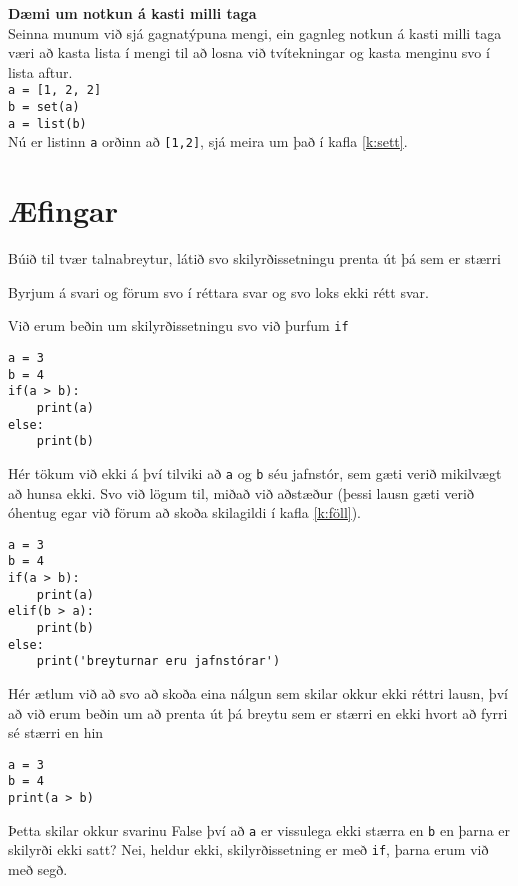 \begin{itarefni}
\textbf{Dæmi um notkun á kasti milli taga}\\
Seinna munum við sjá gagnatýpuna mengi, ein gagnleg notkun á kasti milli taga væri að kasta lista í mengi til að losna við tvítekningar og kasta menginu svo í lista aftur.\\
\texttt{a = [1, 2, 2]}\\
\texttt{b = set(a)}\\
\texttt{a = list(b)}\\
Nú er listinn \texttt{a} orðinn að \texttt{[1,2]}, sjá meira um það í kafla \ref{k:sett}.
\end{itarefni}





\newpage
\section{Æfingar}
\begin{exercise}\label{exp1}
Búið til tvær talnabreytur, látið svo skilyrðissetningu prenta út þá sem er stærri
\end{exercise}
\begin{Answer}[ref={exp1}]
Byrjum á svari og förum svo í réttara svar og svo loks ekki rétt svar.

Við erum beðin um skilyrðissetningu svo við þurfum \texttt{if}	
\begin{lstlisting}
a = 3
b = 4
if(a > b):
	print(a)
else:
	print(b)\end{lstlisting}

Hér tökum við ekki á því tilviki að \texttt{a} og \texttt{b} séu jafnstór, sem gæti verið mikilvægt að hunsa ekki.
Svo við lögum til, miðað við aðstæður (þessi lausn gæti verið óhentug egar við förum að skoða skilagildi í kafla \ref{k:föll}).
\begin{lstlisting}
a = 3
b = 4
if(a > b):
	print(a)
elif(b > a):
	print(b)
else:
	print('breyturnar eru jafnstórar')\end{lstlisting}

	
Hér ætlum við að svo að skoða eina nálgun sem skilar okkur ekki réttri lausn, því að við erum beðin um að prenta út þá breytu sem er stærri en ekki hvort að fyrri sé stærri en hin
\begin{lstlisting}
a = 3
b = 4
print(a > b)\end{lstlisting}
Þetta skilar okkur svarinu False því að \texttt{a} er vissulega ekki stærra en \texttt{b} en þarna er skilyrði ekki satt? Nei, heldur ekki, skilyrðissetning er með \texttt{if}, þarna erum við með segð.
\end{Answer}

